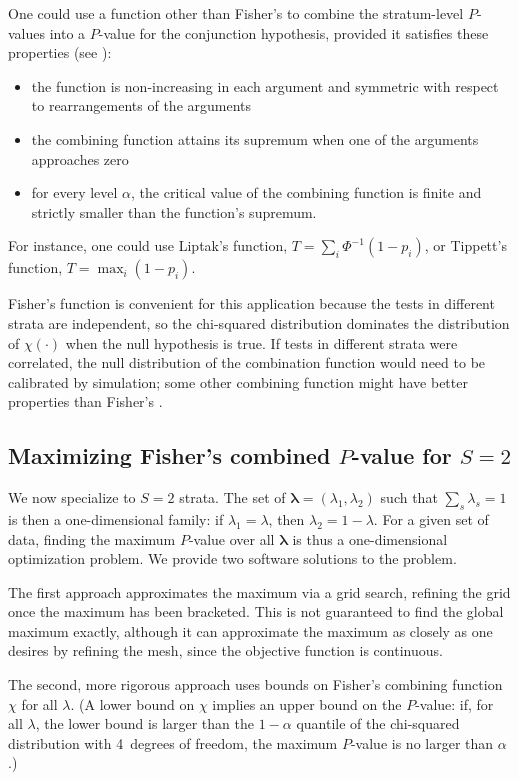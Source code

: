 \documentclass[runningheads]{llncs}
\begin{document}
One could use a function other than Fisher's to combine the stratum-level $P$-values into a $P$-value for the conjunction hypothesis, provided it satisfies these properties (see \cite{pesarinSalmaso10}):
\begin{itemize}
  \item the function is non-increasing in each argument and symmetric with respect to rearrangements of the arguments
  \item the combining function attains its supremum when one of the arguments approaches zero
  \item for every level $\alpha$, the critical value of the combining function is finite and strictly smaller than the function's supremum.
\end{itemize}
For instance, one could use Liptak's function, $T = \sum_i \Phi^{-1}(1-p_i)$,
or Tippett's function, $T = \max_i (1-p_i)$.

Fisher's function is convenient for this application because the tests in different strata are independent, so the chi-squared distribution dominates the distribution of $\chi(\cdot)$ when the null hypothesis is true.
If tests in different strata were correlated, the null distribution of the combination function would need to be calibrated by simulation; some other combining function might have better properties than Fisher's \cite{pesarinSalmaso10}.


\subsection{Maximizing Fisher's combined $P$-value for $S=2$}
We now specialize to $S=2$ strata.
The set of $\mathbf{\lambda} = (\lambda_1, \lambda_2)$ such that $\sum_s \lambda_s = 1$ is then a one-dimensional family: if $\lambda_1 = \lambda$, then $\lambda_2 = 1-\lambda$.
For a given set of data, finding the maximum $P$-value over all $\mathbf{\lambda}$
is thus a one-dimensional optimization problem.
We provide two software solutions to the problem.

The first approach approximates the maximum via a grid search, refining the
grid once the maximum has been bracketed.
This is not guaranteed to find the global maximum exactly, although it can approximate 
the maximum as closely as one desires by refining the mesh, since the objective function is continuous.

The second, more rigorous approach uses bounds on Fisher's combining function $\chi$ for all $\lambda$. 
(A lower bound on $\chi$ implies an upper bound on the $P$-value: if, for all $\lambda$, the lower bound is 
larger than the $1-\alpha$ quantile of the chi-squared distribution with 4~degrees of freedom, the maximum $P$-value is no larger than $\alpha$.)
\end{document}
